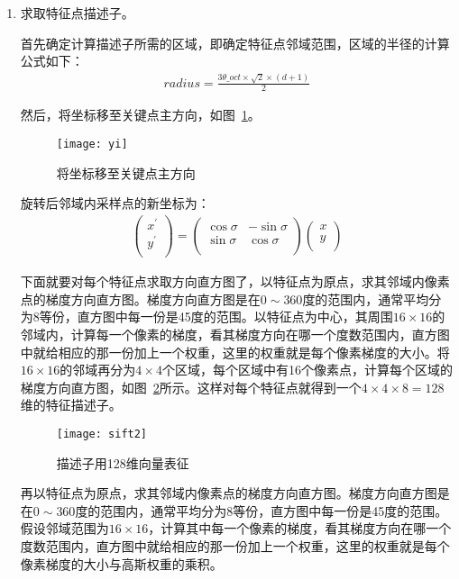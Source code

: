 \begin{enumerate}
\begin{enumerate}
\item 求取特征点描述子。

首先确定计算描述子所需的区域，即确定特征点邻域范围，区域的半径的计算公式如下：
\begin{align}
radius=\frac{3\theta\_oct \times \sqrt{2} \times (d+1)}{2}
\end{align}

然后，将坐标移至关键点主方向，如图~\ref{fig:yi}。
\begin{figure}
\centering
\texttt{[image: yi]}
\caption{将坐标移至关键点主方向}
\label{fig:yi}
\end{figure}
        
旋转后邻域内采样点的新坐标为：
\begin{align}
\left( \begin{array}{c}
x^{'} \\
y^{'} \\
\end{array} \right)
=\left( \begin{array}{cc}
\cos\sigma & -\sin\sigma \\
\sin\sigma & \cos\sigma \\
\end{array} \right)
\left( \begin{array}{c}
x \\
y \\
\end{array} \right)
\end{align}

下面就要对每个特征点求取方向直方图了，以特征点为原点，求其邻域内像素点的梯度方向直方图。梯度方向直方图是在$0\sim360$度的范围内，通常平均分为8等份，直方图中每一份是45度的范围。以特征点为中心，其周围$16\times16$的邻域内，计算每一个像素的梯度，看其梯度方向在哪一个度数范围内，直方图中就给相应的那一份加上一个权重，这里的权重就是每个像素梯度的大小。将$16\times16$的邻域再分为$4\times4$个区域，每个区域中有16个像素点，计算每个区域的梯度方向直方图，如图~\ref{fig: 128dimension}所示。这样对每个特征点就得到一个$4\times4\times8 = 128$维的特征描述子。
\begin{figure}
\centering
\texttt{[image: sift2]}
\caption{描述子用128维向量表征}
\label{fig: 128dimension}
\end{figure}

再以特征点为原点，求其邻域内像素点的梯度方向直方图。梯度方向直方图是在$0\sim360$度的范围内，通常平均分为8等份，直方图中每一份是45度的范围。假设邻域范围为$16\times16$，计算其中每一个像素的梯度，看其梯度方向在哪一个度数范围内，直方图中就给相应的那一份加上一个权重，这里的权重就是每个像素梯度的大小与高斯权重的乘积。


\end{enumerate}
\end{enumerate}
